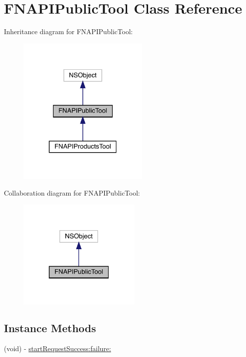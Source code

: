 \hypertarget{interface_f_n_a_p_i_public_tool}{}\section{F\+N\+A\+P\+I\+Public\+Tool Class Reference}
\label{interface_f_n_a_p_i_public_tool}


Inheritance diagram for F\+N\+A\+P\+I\+Public\+Tool\+:\nopagebreak
\begin{figure}[H]
\begin{center}
\leavevmode
\includegraphics[width=183pt]{interface_f_n_a_p_i_public_tool__inherit__graph}
\end{center}
\end{figure}


Collaboration diagram for F\+N\+A\+P\+I\+Public\+Tool\+:\nopagebreak
\begin{figure}[H]
\begin{center}
\leavevmode
\includegraphics[width=171pt]{interface_f_n_a_p_i_public_tool__coll__graph}
\end{center}
\end{figure}
\subsection*{Instance Methods}
\begin{DoxyCompactItemize}
\item 
(void) -\/ \mbox{\hyperlink{interface_f_n_a_p_i_public_tool_ad62ba4530284f2eb3acaccb4ae5e361d}{start\+Request\+Success\+:failure\+:}}
\end{DoxyCompactItemize}
